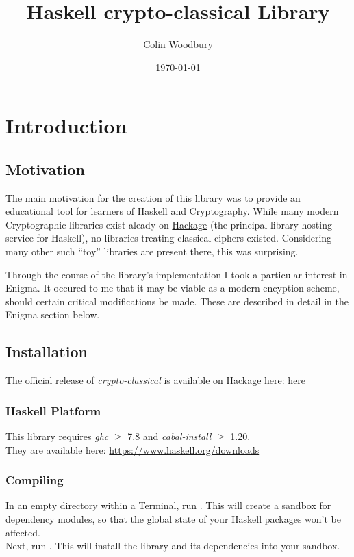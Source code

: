 \documentclass{article}
\begin{document}
\title{Haskell crypto-classical Library}
\author{Colin Woodbury}
\date{\today}
\maketitle

\tableofcontents
\clearpage

\section{Introduction}
\subsection{Motivation}
The main motivation for the creation of this library was to provide
an educational tool for learners of Haskell and Cryptography. While
\href{http://hackage.haskell.org/packages/search?terms=crypto}{many}
modern Cryptographic libraries exist aleady on
\href{http://hackage.haskell.org}{Hackage} (the principal
library hosting service for Haskell), no libraries treating classical
ciphers existed. Considering many other such ``toy'' libraries are
present there, this was surprising.

Through the course of the library's implementation I took a particular
interest in Enigma. It occured to me that it may be viable
as a modern encyption scheme, should certain critical modifications
be made. These are described in detail in the Enigma section below.

\subsection{Installation}
The official release of \emph{crypto-classical} is available on Hackage
here: \url{here}

\subsubsection{Haskell Platform}
This library requires \emph{ghc} $\geq$ 7.8 and
\emph{cabal-install} $\geq$ 1.20.\\
They are available here: \url{https://www.haskell.org/downloads}

\subsubsection{Compiling}
In an empty directory within a Terminal,
run . This will create a
sandbox for dependency modules, so that the global state of your Haskell
packages won't be affected.\\
Next, run . This will install the
library and its dependencies into your sandbox.
\end{document}
